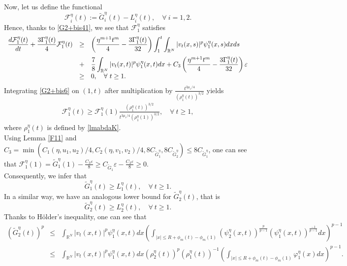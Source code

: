 \documentclass[12pt,leqno]{amsart}
\numberwithin{equation}{section}
\theoremstyle{remark}
\def\R{{\mathbb{R}}}
\def\d{\displaystyle}
\def\e{{\varepsilon}}
\begin{document}
Now, let us define the functional
$$\mathcal{F}^{\eta}_i(t):= \tilde{G}^{\eta}_i(t)-L^{\eta}_i(t), \quad \forall \ i=1,2.$$
Hence, thanks to \eqref{G2+bis41}, we see that $\mathcal{F}^{\eta}_1$ satisfies
\begin{equation}\label{G2+bis6}
\begin{array}{rcl}
\d \frac{d \mathcal{F}^{\eta}_1(t)}{dt}+\frac{3\Gamma_1^{\eta}(t)}{4}\mathcal{F}^{\eta}_1(t) &\ge& \d \left(\frac{\eta^{m+1}t^{m}}{4}-\frac{3\Gamma_1^{\eta}(t)}{32}\right)\int_{1}^t \int_{\R^N}|v_t(x,s)|^p\psi^{\eta}_1(x,s)dx ds\vspace{.2cm}\\ &+&  \d \frac{7}{8}\int_{\R^N}|v_t(x,t)|^p\psi^{\eta}_1(x,t) dx+C_3 \left(\frac{\eta^{m+1}t^{m}}{4}-\frac{3\Gamma_1^{\eta}(t)}{32}\right) \e\\
&\ge&0, \quad \forall \ t \ge 1.
\end{array}
\end{equation}
Integrating \eqref{G2+bis6} on $(1,t)$ after multiplication  by $\frac{t^{3 \mu_1/4}}{(\rho_1^{\eta}(t))^{3/2}}$ yields
\begin{align}\label{est-G111}
 \mathcal{F}_1^{\eta}(t)
\ge \mathcal{F}_1^{\eta}(1)\frac{(\rho_1^{\eta}(t))^{3/2}}{t^{3 \mu_1/4}(\rho_1^{\eta}(1))^{3/2}}, \quad \forall \ t \ge 1,
\end{align}
where $\rho_1^{\eta}(t)$ is defined by \eqref{lmabdaK}.\\
Using Lemma \ref{F11} and $C_3=\min(C_1(\eta,u_1,u_2)/4,C_2(\eta, v_1,v_2)/4,8C_{\tilde{G}^{\eta}_1},8C_{\tilde{G}^{\eta}_2}) \le 8C_{\tilde{G}^{\eta}_1}$, one can see that $\d \mathcal{F}^{\eta}_1(1)=\tilde{G}^{\eta}_1(1)-\frac{C_3 \e}{8} \ge C_{\tilde{G}_1}\e -\frac{C_3 \e}{8}\ge 0$. \\
Consequently, we infer that
\begin{equation}
\label{G2-est}
\tilde{G}^{\eta}_1(t) \geq L^{\eta}_1(t), \quad \forall \ t \ge 1.
\end{equation}
In a similar way, we have an analogous lower bound for $\tilde{G}^{\eta}_2(t)$, that is
\begin{equation}
\label{G2-est-bis}
\tilde{G}^{\eta}_2(t) \geq L^{\eta}_2(t), \quad \forall \ t \ge 1.
\end{equation}
Thanks to  H\"{o}lder's inequality,  one can see that
\begin{equation}
\begin{array}{rcl}
\d (\tilde{G}^{\eta}_2(t))^p &\le&  \d \int_{\R^N}|v_t(x,t)|^p\psi^{\eta}_1(x,t)dx \left(\int_{|x|\leq R+\phi_{m}(t)-\phi_{m}(1)}(\psi^{\eta}_2(x,t))^{\frac{p}{p-1}}(\psi^{\eta}_1(x,t))^{\frac{-1}{p-1}}dx\right)^{p-1}\\
&\le& \d \int_{\R^N}|v_t(x,t)|^p\psi^{\eta}_1(x,t)dx  (\rho^{\eta}_2(t))^{p} (\rho^{\eta}_1(t))^{-1} \left(\int_{|x|\leq R+\phi_{m}(t)-\phi_{m}(1)}\varphi^{\eta}_1(x) dx\right)^{p-1}.
\end{array}
\end{equation}
\end{document}
